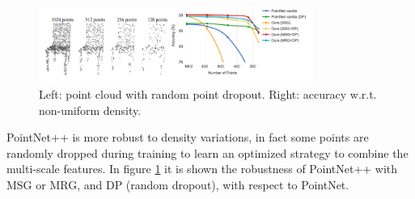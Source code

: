\begin{figure}[ht]
    \centering
    \includegraphics[width=0.8\textwidth]{images/pointnet++_density_robustness.png}
    \caption{Left: point cloud with random point dropout. Right: accuracy w.r.t. non-uniform density.}
    \label{fig:pointnet++_density_robustness}
\end{figure}

PointNet++ is more robust to density variations, in fact some points are randomly dropped during training to learn an optimized strategy to combine the multi-scale features. In figure \ref{fig:pointnet++_density_robustness} it is shown the robustness of PointNet++ with MSG or MRG, and DP (random dropout), with respect to PointNet.